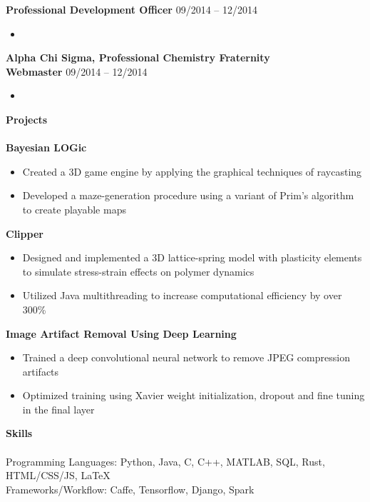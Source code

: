 \documentclass{article}
\begin{document}
\noindent
\textbf{Professional Development Officer}
\hfill 09/2014 -- 12/2014
\begin{itemize}
\vspace{-1.8mm}
\item 
\end{itemize}

\noindent
\textbf{Alpha Chi Sigma, Professional Chemistry Fraternity} \\
\textbf{Webmaster}
\hfill 09/2014 -- 12/2014
\begin{itemize}
\vspace{-1.8mm}
\item 
\end{itemize}

\noindent
\textbf{\Large Projects}\\[-2mm]
\HRule\\
\textbf{Bayesian LOGic} 
\begin{itemize}
\vspace{-1.8mm}
\item Created a 3D game engine by applying the graphical techniques of raycasting
\vspace{-2.5mm}
\item Developed a maze-generation procedure using a variant of Prim's algorithm to create playable maps
\end{itemize}
\vspace{-1.8mm}
\noindent
\textbf{Clipper} 
\begin{itemize}
\vspace{-2.5mm}
\item Designed and implemented a 3D lattice-spring model with plasticity elements to simulate stress-strain effects on polymer dynamics
\vspace{-2.5mm}
\item Utilized Java multithreading to increase computational efficiency by over 300\%
\end{itemize}
\vspace{-1.8mm}

\noindent
\textbf{Image Artifact Removal Using Deep Learning}
\begin{itemize}
\vspace{-1.8mm}
\item Trained a deep convolutional neural network to remove JPEG compression artifacts
\vspace{-2.5mm}
\item Optimized training using Xavier weight initialization, dropout and fine tuning in the final layer
\end{itemize}

\noindent
\textbf{\Large Skills}\\[-2mm]
\HRule\\
Programming Languages: Python, Java, C, C++, MATLAB, SQL, Rust, HTML/CSS/JS, \LaTeX \\
Frameworks/Workflow: Caffe, Tensorflow, Django, Spark

\end{document}
